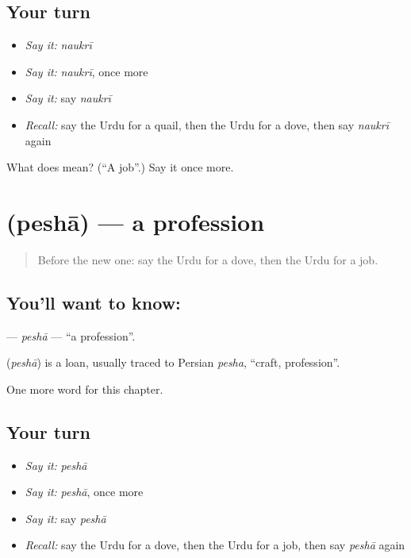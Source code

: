 \subsection*{Your turn}
\begin{itemize}
\raggedright
  \item \emph{Say it:} \emph{naukrī}
  \item \emph{Say it:} \emph{naukrī}, once more
  \item \emph{Say it:} say \emph{naukrī}
  \item \emph{Recall:} say the Urdu for a quail, then the Urdu for a dove, then say \emph{naukrī} again
\end{itemize}

\begin{tcolorbox}[breakable,colback=teal!4,colframe=teal!35!black,title={Before you move on}]
What does  mean? (\textquotedblleft{}A job\textquotedblright{}.) Say it once more.
\end{tcolorbox}
\section[\texorpdfstring{\ur{پیشہ} (peshā)}{پیشہ (peshā)}]{ (peshā) — a profession}

\label{lesson:UR-C176-pesha}



\begin{quote}
Before the new one: say the Urdu for a dove, then the Urdu for a job.
\end{quote}

\subsection*{You'll want to know: }
\textbf{} — \emph{peshā} — \textquotedblleft{}a profession\textquotedblright{}.

\begin{cousinweb}
\textbf{} (\emph{peshā}) is a loan, usually traced to Persian \emph{pesha}, \textquotedblleft{}craft, profession\textquotedblright{}.
\end{cousinweb}

\begin{grammarlens}[title={What you've built}]
One more word for this chapter.
\end{grammarlens}

\subsection*{Your turn}
\begin{itemize}
\raggedright
  \item \emph{Say it:} \emph{peshā}
  \item \emph{Say it:} \emph{peshā}, once more
  \item \emph{Say it:} say \emph{peshā}
  \item \emph{Recall:} say the Urdu for a dove, then the Urdu for a job, then say \emph{peshā} again
\end{itemize}

